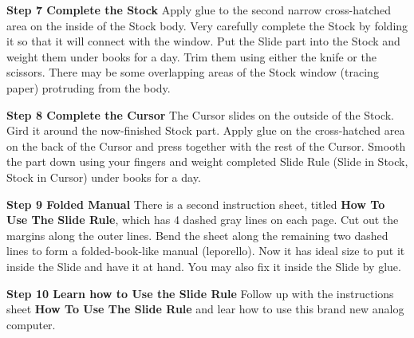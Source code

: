 \begin{multicols*}{3}
{  \textbf{Step 7 Complete the Stock} Apply glue to the second narrow cross-hatched area on the inside of the Stock body. Very carefully complete the Stock by folding it so that it will connect with the window. Put the Slide part into the Stock and weight them under books for a day.
Trim them using either the knife or the scissors.
There may be some overlapping areas of the Stock window (tracing paper) protruding from the body. 

  \textbf{Step 8 Complete the Cursor} The Cursor slides on the outside of the Stock. Gird it around the now-finished Stock part. Apply glue on the cross-hatched area on the back of the Cursor and press together with the rest of the Cursor. Smooth the part down using your fingers and weight completed Slide Rule (Slide in Stock, Stock in Cursor) under books for a day.

  \textbf{Step 9 Folded Manual} There is a second instruction sheet, titled \textbf{How To Use The Slide Rule}, which has 4 dashed gray lines 
on each page. Cut out the margins along the outer lines. Bend the sheet along the remaining two dashed lines to form a folded-book-like manual (leporello). Now it has ideal size to put it inside the Slide and have it at hand. You may also fix it inside the Slide by glue.

  \textbf{Step 10 Learn how to Use the Slide Rule} Follow up with the instructions sheet \textbf{How To Use The Slide Rule} and lear how to use this brand new analog computer.

  }
  \end{multicols*}
  

